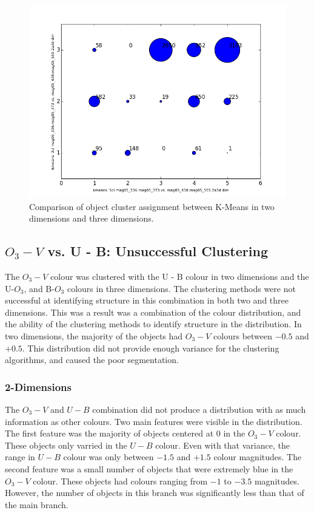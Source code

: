 \begin{figure}[H]
\centering
\includegraphics[width=\linewidth]{figs/successful/kmeans-5cl_mag05_336-mag05_373_vs_kmeans-3cl_mag05_336-mag05_373_mag05_438-mag05_555_2a3ddim_compare}
\caption{Comparison of object cluster assignment between K-Means in two dimensions and three dimensions.}
\label{fig:UOIIKMcomp2-3d}
\end{figure}

%
%
%
%
%
%
%
%
%
%

\subsection{$O_{3} - V$ vs. U - B: Unsuccessful Clustering}
The $O_{3} - V$ colour was clustered with the U - B colour in two dimensions and the U-$O_{3}$, and B-$O_{3}$ colours in three dimensions.
The clustering methods were not successful at identifying structure in this combination in both two and three dimensions.
This was a result was a combination of the colour distribution, and the ability of the clustering methods to identify structure in the distribution.
In two dimensions, the majority of the objects had $O_{3} - V$ colours between $-0.5$ and $+0.5$. 
This distribution did not provide enough variance for the clustering algorithms, and caused the poor segmentation.

\subsubsection{2-Dimensions}
The $O_{3} - V$ and $U - B$ combination did not produce a distribution with as much information as other colours.
Two main features were visible in the distribution.
The first feature was the majority of objects centered at 0 in the $O_{3} - V$ colour.
These objects only varried in the $U - B$ colour.
Even with that variance, the range in $U - B$ colour was only between $-1.5$ and $+1.5$ colour magnitudes.
The second feature was a small number of objects that were extremely blue in the $O_{3} - V$ colour. 
These objects had colours ranging from $-1$ to $-3.5$ magnitudes.
However, the number of objects in this branch was significantly less than that of the main branch.

